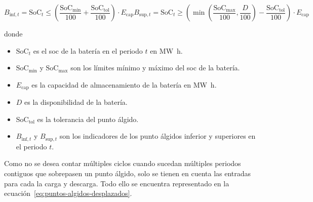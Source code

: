 \begin{samepage}

  \begin{subequations}
    \label{eq:puntos-algidos-inf-sup}

    \begin{equation}
      B_{\text{inf}, t} = \mathrm{SoC}_{t} \le \left( \frac{\mathrm{SoC}_{\text{min}}}{100} + \frac{\mathrm{SoC}_{\text{tol}}}{100} \right) \cdot E_{\text{cap}}
    \end{equation}

    \begin{equation}
      B_{\text{sup}, t} = \mathrm{SoC}_{t} \ge \left( \min\left(\frac{\mathrm{SoC}_{\text{max}}}{100}, \frac{D}{100}\right) - \frac{\mathrm{SoC}_{\text{tol}}}{100} \right) \cdot E_{\text{cap}}
    \end{equation}

  \end{subequations}

  donde

  \begin{itemize}

    \item \( \mathrm{SoC}_{t} \) es el \gls{soc} de la batería en el periodo \( t \) en \si{{\mega\watt\hour}}.

    \item \( \mathrm{SoC}_{\text{min}} \) y \( \mathrm{SoC}_{\text{max}} \) son los límites mínimo y máximo del \gls{soc} de la batería.

    \item \( E_{\text{cap}} \) es la capacidad de almacenamiento de la batería en \si{{\mega\watt\hour}}.

    \item \( D \) es la disponibilidad de la batería.

    \item \( \mathrm{SoC}_{\text{tol}} \) es la tolerancia del punto álgido.

    \item \( B_{\text{inf}, t} \) y \( B_{\text{sup}, t} \) son los indicadores de los punto álgidos inferior y superiores en el periodo \( t \).

  \end{itemize}

\end{samepage}

Como no se desea contar múltiples ciclos cuando sucedan múltiples periodos contiguos que sobrepasen un punto álgido, solo se tienen en cuenta las entradas para cada la carga y descarga. Todo ello se encuentra representado en la ecuación~\ref{eq:puntos-algidos-desplazados}.

